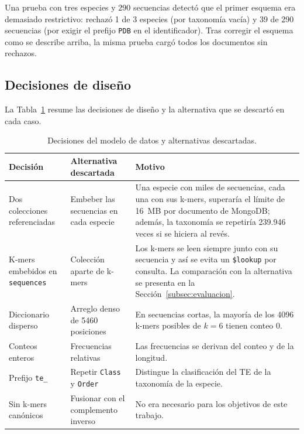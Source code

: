 \documentclass[pdflatex,lineno,referee,sn-vancouver-num]{sn-jnl}
\theoremstyle{thmstyleone}%
\theoremstyle{thmstyletwo}%
\theoremstyle{thmstylethree}%
\begin{document}
Una prueba con tres especies y 290 secuencias detectó que el primer esquema era demasiado restrictivo: rechazó 1 de 3 especies (por taxonomía vacía) y 39 de 290 secuencias (por exigir el prefijo \texttt{PDB} en el identificador). Tras corregir el esquema como se describe arriba, la misma prueba cargó todos los documentos sin rechazos.

\subsection{Decisiones de diseño}\label{subsec:decisiones}

La Tabla~\ref{tab:decisiones} resume las decisiones de diseño y la alternativa que se descartó en cada caso.

\begin{table}[htbp]
  \centering
  \caption{Decisiones del modelo de datos y alternativas descartadas.}
  \label{tab:decisiones}
  \begin{tabularx}{\linewidth}{>{\raggedright\arraybackslash}p{3.1cm} >{\raggedright\arraybackslash}p{3.1cm} X}
    \toprule
    Decisión & Alternativa descartada & Motivo \\
    \midrule
    Dos colecciones referenciadas & Embeber las secuencias en cada especie &
      Una especie con miles de secuencias, cada una con sus k-mers, superaría el límite de 16~MB por documento de MongoDB; además, la taxonomía se repetiría 239.946 veces si se hiciera al revés. \\
    K-mers embebidos en \texttt{sequences} & Colección aparte de k-mers &
      Los k-mers se leen siempre junto con su secuencia y así se evita un \texttt{\$lookup} por consulta. La comparación con la alternativa se presenta en la Sección~\ref{subsec:evaluacion}. \\
    Diccionario disperso & Arreglo denso de 5460 posiciones &
      En secuencias cortas, la mayoría de los 4096 k-mers posibles de $k=6$ tienen conteo 0. \\
    Conteos enteros & Frecuencias relativas &
      Las frecuencias se derivan del conteo y de la longitud. \\
    Prefijo \texttt{te\_} & Repetir \texttt{Class} y \texttt{Order} &
      Distingue la clasificación del TE de la taxonomía de la especie. \\
    Sin k-mers canónicos & Fusionar con el complemento inverso &
      No era necesario para los objetivos de este trabajo. \\
    \bottomrule
  \end{tabularx}
\end{table}
\end{document}
